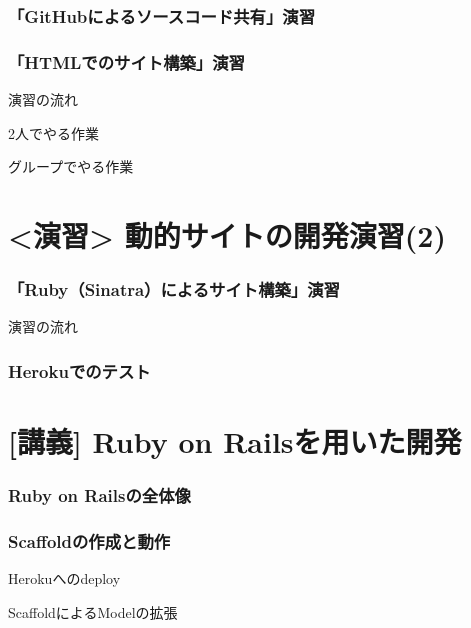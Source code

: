 \documentclass[12pt, t, aspectratio=169]{beamer}
\begin{document}
\section{「GitHubによるソースコード共有」演習}
\label{sec-8-3}
\begin{frame}[label=sec-8-3-1]{}
\end{frame}
\section{「HTMLでのサイト構築」演習}
\label{sec-8-4}
\begin{frame}[label=sec-8-4-1]{演習の流れ}
\end{frame}
\begin{frame}[label=sec-8-4-2]{}
\end{frame}
\begin{frame}[label=sec-8-4-3]{2人でやる作業}
\end{frame}
\begin{frame}[label=sec-8-4-4]{グループでやる作業}
\end{frame}
\part{<演習> 動的サイトの開発演習(2)}
\label{sec-9}
\section{「Ruby（Sinatra）によるサイト構築」演習}
\label{sec-9-1}
\begin{frame}[label=sec-9-1-1]{演習の流れ}
\end{frame}
\section{Herokuでのテスト}
\label{sec-9-2}
\part{[講義] Ruby on Railsを用いた開発}
\label{sec-10}
\section{Ruby on Railsの全体像}
\label{sec-10-1}
\section{Scaffoldの作成と動作}
\label{sec-10-2}
\begin{frame}[label=sec-10-2-1]{Herokuへのdeploy}
\end{frame}
\begin{frame}[label=sec-10-2-2]{ScaffoldによるModelの拡張}
\end{frame}
\end{document}
